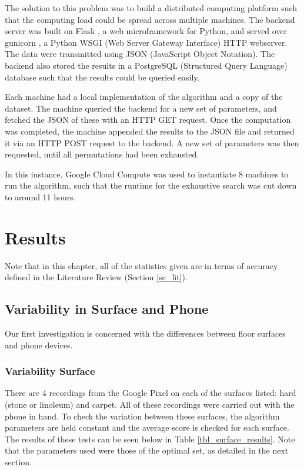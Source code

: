         The solution to this problem was to build a distributed computing platform such that the computing load could be spread across multiple machines. The backend server was built on Flask \cite{flask}, a web microframework for Python, and served over gunicorn \cite{gunicorn}, a Python WSGI (Web Server Gateway Interface) HTTP webserver. The data were transmitted using JSON (JavaScript Object Notation). The backend also stored the results in a PostgreSQL (Structured Query Language) database \cite{postgres} such that the results could be queried easily.

        Each machine had a local implementation of the algorithm and a copy of the dataset. The machine queried the backend for a new set of parameters, and fetched the JSON of these with an HTTP GET request. Once the computation was completed, the machine appended the results to the JSON file and returned it via an HTTP POST request to the backend. A new set of parameters was then requested, until all permutations had been exhausted.

        In this instance, Google Cloud Compute \cite{gcc} was used to instantiate 8 machines to run the algorithm, such that the runtime for the exhaustive search was cut down to around 11 hours.

    \chapter{Results}

        Note that in this chapter, all of the statistics given are in terms of accuracy defined in the Literature Review (Section \ref{sc_lit}).

        \section{Variability in Surface and Phone}

            Our first investigation is concerned with the differences between floor surfaces and phone devices. 

            \subsection{Variability Surface}

                There are 4 recordings from the Google Pixel on each of the surfaces listed: hard (stone or linoleum) and carpet. All of these recordings were carried out with the phone in hand. To check the variation between these surfaces, the algorithm parameters are held constant and the average score is checked for each surface. The results of these tests can be seen below in Table \ref{tbl_surface_results}. Note that the parameters used were those of the optimal set, as detailed in the next section.

